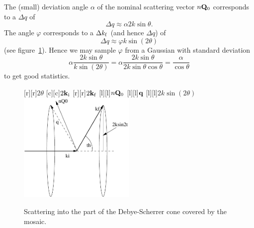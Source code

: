 The (small) deviation angle $\alpha$ of the nominal
scattering vector $n{\bf Q}_0$ corresponds to a $\Delta q$ of
\begin{equation}
\Delta q \approx \alpha 2k\sin\theta.
\end{equation}
The angle $\varphi$ corresponds to a $\Delta k_{\rm f}$ (and hence
$\Delta q$) of
\begin{equation}
\Delta q \approx \varphi k \sin(2\theta)
\end{equation}
(see figure~\ref{f:mosaic_cone}).
Hence we may sample $\varphi$ from a Gaussian with standard deviation
\begin{equation}
\alpha\frac{2k\sin\theta}{k\sin(2\theta)} =
\alpha\frac{2k\sin\theta}{2k\sin\theta\cos\theta} =
\frac{\alpha}{\cos\theta}
\end{equation}
to get good statistics.
%
\begin{figure}
  \begin{center}
    [r][r]{$2\theta$}
    [c][c]{$2{\bf k}_{\rm i}$}
    [r][r]{$2{\bf k}_{\rm f}$}
    [l][l]{$n{\bf Q}_0$}
    [l][l]{$\bf q$}
    [l][l]{$2 k \sin(2 \theta)$}
    \includegraphics[width=0.5\textwidth]{figures/mosaic_cone}
  \end{center}
\caption{Scattering into the part of the Debye-Scherrer cone covered by
    the mosaic.}
\label{f:mosaic_cone}
\end{figure}

